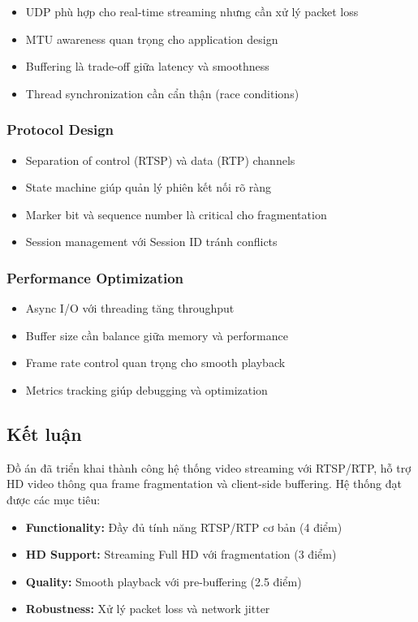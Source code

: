 \begin{itemize}
    \item UDP phù hợp cho real-time streaming nhưng cần xử lý packet loss
    \item MTU awareness quan trọng cho application design
    \item Buffering là trade-off giữa latency và smoothness
    \item Thread synchronization cần cẩn thận (race conditions)
\end{itemize}

\subsubsection{Protocol Design}

\begin{itemize}
    \item Separation of control (RTSP) và data (RTP) channels
    \item State machine giúp quản lý phiên kết nối rõ ràng
    \item Marker bit và sequence number là critical cho fragmentation
    \item Session management với Session ID tránh conflicts
\end{itemize}

\subsubsection{Performance Optimization}

\begin{itemize}
    \item Async I/O với threading tăng throughput
    \item Buffer size cần balance giữa memory và performance
    \item Frame rate control quan trọng cho smooth playback
    \item Metrics tracking giúp debugging và optimization
\end{itemize}

\subsection{Kết luận}

Đồ án đã triển khai thành công hệ thống video streaming với RTSP/RTP, hỗ trợ HD video thông qua frame fragmentation và client-side buffering. Hệ thống đạt được các mục tiêu:

\begin{itemize}
    \item \textbf{Functionality:} Đầy đủ tính năng RTSP/RTP cơ bản (4 điểm)
    \item \textbf{HD Support:} Streaming Full HD với fragmentation (3 điểm)
    \item \textbf{Quality:} Smooth playback với pre-buffering (2.5 điểm)
    \item \textbf{Robustness:} Xử lý packet loss và network jitter
\end{itemize}

